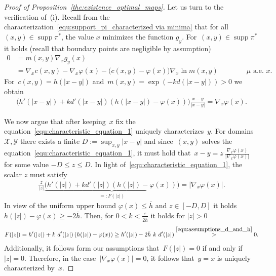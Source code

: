 \documentclass{article}
\theoremstyle{definition}
\DeclareMathOperator{\supp}{supp}
\begin{document}
\begin{proof}[Proof of Proposition~\ref{the:existence_optimal_maps}]
Let us turn to the verification of~(i).
Recall from the characterization~\eqref{equ:support_pi_characterized via minima} that for all $(x,y) \in \supp \pi^*$, the value $x$ minimizes the function $g_y$. For~$(x,y) \in \supp \pi^*$ it holds (recall that boundary points are negligible by assumption)
\begin{align}\label{equ:characteristic_equation_optimal_map}
    0 &= m(x,y) \nabla_x g_y(x)  \\ & =  \nabla_x c(x,y) - \nabla_x \varphi (x) - \Big(  c(x,y) - \varphi (x)  \Big)  \nabla_x   \ln m(x,y) \qquad \qquad \mbox{$\mu$ a.e.~$x$.} 
\end{align}
For~$c(x,y)= h(|x-y|)$ and~$m(x,y)= \exp (-k d(|x-y|)) >0$ we obtain
\begin{align}\label{equ:characteristic_equation_1}
    \Big(  h'(|x-y|)   + k  d'(|x-y|) \left(h(|x-y|) - \varphi(x) \right) \Big) \frac{x-y}{|x-y|} =  \nabla_x \varphi (x).
\end{align}

We now argue that after keeping~$x$ fix the equation~\eqref{equ:characteristic_equation_1} uniquely characterizes~$y$. 
For domains $\mathcal{X}, \mathcal{Y}$ there exists a finite $D:= \sup_{x,y} |x-y|$ and since~$(x,y)$ solves the equation~\eqref{equ:characteristic_equation_1}, it must hold that~$x-y = z \ \frac{\nabla_x \varphi(x)}{|\nabla_x \varphi(x)|}$ for some value $-D \leq z \leq D$. In light of~\eqref{equ:characteristic_equation_1}, the scalar $z$ must satisfy
\begin{align}\label{eq:T(z)}
    \frac{z}{|z|} \underbrace{\Big(  h'(|z|) +  k  d'(|z|) \left(h(|z|) - \varphi(x) \right)  \Big)}_{=:F(|z|)} = |\nabla_x \varphi(x)|.
\end{align}
In view of the uniform upper bound $\varphi(x) \leq \bar{h}$ and $z \in [-D, D]$ it holds $h(|z|) - \varphi(x)  \geq -2\bar{h}$. Then, for $0 < k < \frac{\varepsilon}{2 \bar{h}}$ it holds for $|z| > 0$
\begin{align*}
    F(|z|) =  h'(|z|) +  k \  d'(|z|) \left(h(|z|) - \varphi(x) \right)  \geq  h'(|z|) - 2 \bar{h} \ k \  d'(|z|) \overset{\eqref{equ:assumptions_d_and_h}}{>} 0.
\end{align*}
Additionally, it follows form our assumptions that~$F(|z|) = 0 $ if and only if~$|z|=0$. Therefore, in the case~$|\nabla_x \varphi(x)| =0$, it follows that~$y=x$ is uniquely characterized by~$x$. \smallskip


\end{proof}
\end{document}
